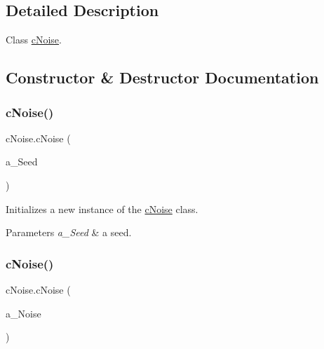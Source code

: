 \subsection{Detailed Description}
Class \hyperlink{classc_noise}{c\+Noise}. 



\subsection{Constructor \& Destructor Documentation}
\mbox{\label{classc_noise_a44626c294b22756496d6dd0884dd3406}} 
\subsubsection{\texorpdfstring{c\+Noise()}{cNoise()}\hspace{0.1cm}{\footnotesize\ttfamily [1/2]}}
{\footnotesize\ttfamily c\+Noise.\+c\+Noise (\begin{DoxyParamCaption}\item[{int}]{a\+\_\+\+Seed }\end{DoxyParamCaption})\hspace{0.3cm}{\ttfamily [inline]}}



Initializes a new instance of the \hyperlink{classc_noise}{c\+Noise} class. 


\begin{DoxyParams}{Parameters}
{\em a\+\_\+\+Seed} & a seed.\\
\hline
\end{DoxyParams}
\mbox{\label{classc_noise_adbeed008318f12a15a5d77a50c4d3b2b}} 
\subsubsection{\texorpdfstring{c\+Noise()}{cNoise()}\hspace{0.1cm}{\footnotesize\ttfamily [2/2]}}
{\footnotesize\ttfamily c\+Noise.\+c\+Noise (\begin{DoxyParamCaption}\item[{\hyperlink{classc_noise}{c\+Noise}}]{a\+\_\+\+Noise }\end{DoxyParamCaption})\hspace{0.3cm}{\ttfamily [inline]}}



